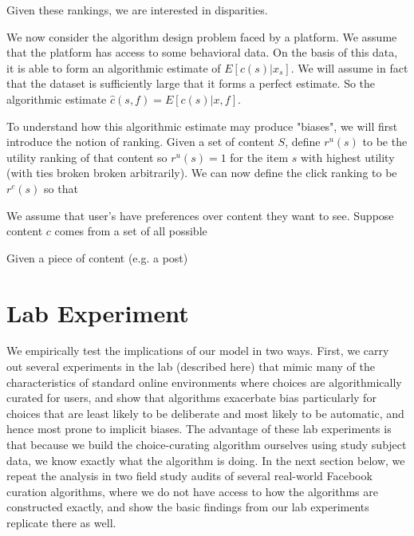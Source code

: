 \documentclass[12pt,letterpaper]{article}
\begin{document}

Given these rankings, we are interested in disparities. 





We now consider the algorithm design problem faced by a platform. We assume that the platform has access to some behavioral data. On the basis of this data, it is able to form an algorithmic estimate of $E[c(s)|x_s]$. We will assume in fact that the dataset is sufficiently large that it forms a perfect estimate. So the algorithmic estimate $\hat{c}(s,f) = E[c(s)|x,f]$. 

To understand how this algorithmic estimate may produce "biases", we will first introduce the notion of ranking. Given a set of content $S$, define $r^u(s)$ to be the utility ranking of that content so $r^u(s) = 1$ for the item $s$ with highest utility (with ties broken broken arbitrarily). We can now define the click ranking to be $r^c(s)$ so that 


We assume that user's have preferences over content they want to see. Suppose content $c$ comes from a set of all possible 

Given a piece of content (e.g. a post)  

\section{Lab Experiment}
We empirically test the implications of our model in two ways. First, we carry out several experiments in the lab (described here) that mimic many of the characteristics of standard online environments where choices are algorithmically curated for users, and show that algorithms exacerbate bias particularly for choices that are least likely to be deliberate and most likely to be automatic, and hence most prone to implicit biases. The advantage of these lab experiments is that because we build the choice-curating algorithm ourselves using study subject data, we know exactly what the algorithm is doing. In the next section below, we repeat the analysis in two field study audits of several real-world Facebook curation algorithms, where we do not have access to how the algorithms are constructed exactly, and show the basic findings from our lab experiments replicate there as well.
\end{document}
